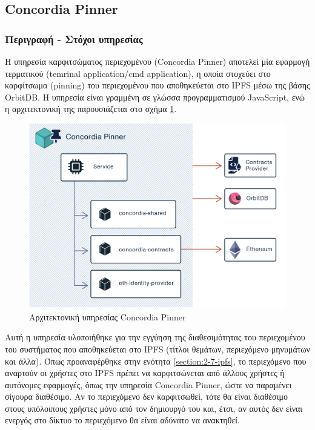 \subsection{Concordia Pinner} \label{subsection:4-3-4-concordia-pinner-service}

\subsubsection{Περιγραφή - Στόχοι υπηρεσίας}

Η υπηρεσία καρφιτσώματος περιεχομένου (Concordia Pinner) αποτελεί μία εφαρμογή τερματικού (temrinal application/cmd application), η οποία στοχεύει στο καρφίτσωμα (pinning) του περιεχομένου που αποθηκεύεται στο IPFS μέσω της βάσης OrbitDB. Η υπηρεσία είναι γραμμένη σε γλώσσα προγραμματισμού JavaScript, ενώ η αρχιτεκτονική της παρουσιάζεται στο σχήμα \ref{figure:4-3-concordia-pinner-architecture}.

\vspace{.5\baselineskip}

\begin{figure}[H]
    \centering
    \includegraphics[width=.75\textwidth]{assets/figures/chapter-4/4.3.architecture-4.3.4.concordia-pinner-architecture}
    \caption{Αρχιτεκτονική υπηρεσίας Concordia Pinner}
    \label{figure:4-3-concordia-pinner-architecture}
\end{figure}

Αυτή η υπηρεσία υλοποιήθηκε για την εγγύηση της διαθεσιμότητας του περιεχομένου του συστήματος που αποθηκεύεται στο IPFS (τίτλοι θεμάτων, περιεχόμενο μηνυμάτων και άλλα). Όπως προαναφέρθηκε στην ενότητα \ref{section:2-7-ipfs}, το περιεχόμενο που αναρτούν οι χρήστες στο IPFS πρέπει να καρφιτσώνεται από άλλους χρήστες ή αυτόνομες εφαρμογές, όπως την υπηρεσία Concordia Pinner, ώστε να παραμένει σίγουρα διαθέσιμο. Αν το περιεχόμενο δεν καρφιτσωθεί, τότε θα είναι διαθέσιμο στους υπόλοιπους χρήστες μόνο από
τον δημιουργό του και, έτσι, αν αυτός δεν είναι ενεργός στο δίκτυο το περιεχόμενο θα είναι αδύνατο να ανακτηθεί.

